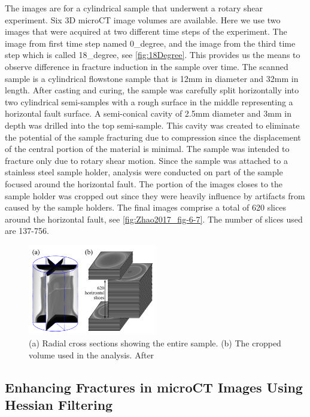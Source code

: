 \documentclass{edger}
\begin{document}
The images are for a cylindrical sample that underwent a rotary shear experiment. Six 3D microCT image volumes are available. Here we use two images that were acquired at two different time steps of the experiment. The image from first time step named 0\_degree, and the image from the third time step which is called 18\_degree, see \autoref{fig:18Degree}. This provides us the means to observe difference in fracture induction in the sample over time. The scanned sample is a cylindrical flowstone sample that is 12mm in diameter and 32mm in length. After casting and curing, the sample was carefully split horizontally into two cylindrical semi-samples with a rough surface in the middle representing a horizontal fault surface. A semi-conical cavity of 2.5mm diameter and 3mm in depth was drilled into the top semi-sample. This cavity was created to eliminate the potential of the sample fracturing due to compression since the displacement of the central portion of the material is minimal. The sample was intended to fracture only due to rotary shear motion. Since the sample was attached to a stainless steel sample holder, analysis were conducted on part of the sample focused around the horizontal fault. The portion of the images closes to the sample holder was cropped out since they were heavily influence by artifacts from caused by the sample holders. The final images comprise a total of 620 slices around the horizontal fault, see \autoref{fig:Zhao2017_fig-6-7}. The number of slices used are 137-756. 

\begin{figure}[!h]
\centering
\includegraphics[width=0.5\textwidth]{Zhao2017_6-7.png}
\caption{(a) Radial cross sections showing the entire sample. (b) The cropped volume used in the analysis. After \cite{Zhao2017}}
\label{fig:Zhao2017_fig-6-7}
\end{figure}

\subsection{Enhancing Fractures in microCT Images Using Hessian Filtering} \label{sec:Enhancing Fractures in microCT Images Using Hessian Filtering} \label{sec:EnhancingFractturesInMicroCTImages}
\end{document}
